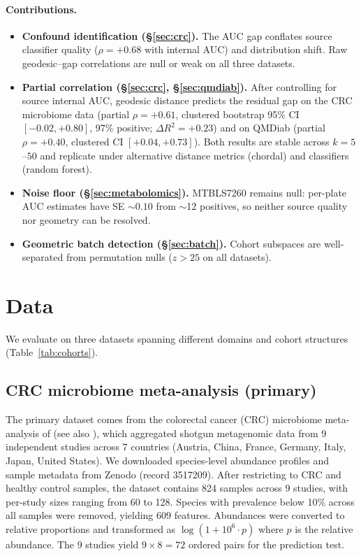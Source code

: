 \documentclass{article}
\begin{document}
\paragraph{Contributions.}
\begin{itemize}
\item \textbf{Confound identification (\S\ref{sec:crc}).} The AUC gap conflates source classifier quality ($\rho = +0.68$ with internal AUC) and distribution shift. Raw geodesic--gap correlations are null or weak on all three datasets.
\item \textbf{Partial correlation (\S\ref{sec:crc}, \S\ref{sec:qmdiab}).} After controlling for source internal AUC, geodesic distance predicts the residual gap on the CRC microbiome data (partial $\rho = +0.61$, clustered bootstrap 95\% CI $[-0.02, +0.80]$, 97\% positive; $\Delta R^2 = +0.23$) and on QMDiab (partial $\rho = +0.40$, clustered CI $[+0.04, +0.73]$). Both results are stable across $k = 5$--$50$ and replicate under alternative distance metrics (chordal) and classifiers (random forest).
\item \textbf{Noise floor (\S\ref{sec:metabolomics}).} MTBLS7260 remains null: per-plate AUC estimates have SE $\sim 0.10$ from $\sim$12 positives, so neither source quality nor geometry can be resolved.
\item \textbf{Geometric batch detection (\S\ref{sec:batch}).} Cohort subspaces are well-separated from permutation nulls ($z > 25$ on all datasets).
\end{itemize}


\section{Data}

We evaluate on three datasets spanning different domains and cohort structures (Table~\ref{tab:cohorts}).

\subsection{CRC microbiome meta-analysis (primary)}
\label{sec:crc_data}

The primary dataset comes from the colorectal cancer (CRC) microbiome meta-analysis of \citet{wirbel2019meta} (see also \citealp{thomas2019metaanalysis}), which aggregated shotgun metagenomic data from 9 independent studies across 7 countries (Austria, China, France, Germany, Italy, Japan, United States). We downloaded species-level abundance profiles and sample metadata from Zenodo (record 3517209). After restricting to CRC and healthy control samples, the dataset contains 824 samples across 9 studies, with per-study sizes ranging from 60 to 128. Species with prevalence below 10\% across all samples were removed, yielding 609 features. Abundances were converted to relative proportions and transformed as $\log(1 + 10^6 \cdot p)$ where $p$ is the relative abundance. The 9 studies yield $9 \times 8 = 72$ ordered pairs for the prediction test.
\end{document}
